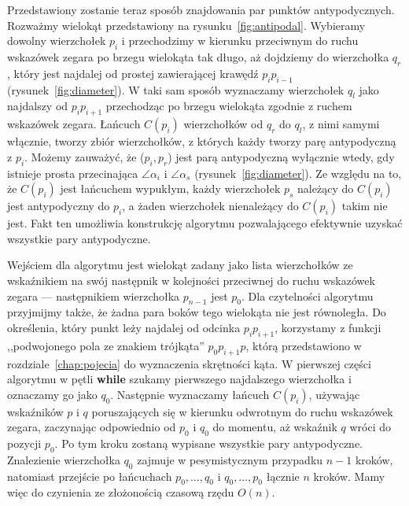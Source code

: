 Przedstawiony zostanie teraz sposób znajdowania par punktów
antypodycznych. Rozważmy wielokąt przedstawiony na
rysunku~\ref{fig:antipodal}. Wybieramy dowolny wierzchołek $p_i$ i
przechodzimy w kierunku przeciwnym do ruchu wskazówek zegara po brzegu
wielokąta tak długo, aż dojdziemy do wierzchołka $q_r$, który jest
najdalej od prostej zawierającej krawędź $p_{i}p_{i-1}$
(rysunek~\ref{fig:diameter}). W taki sam sposób wyznaczamy wierzchołek
$q_l$ jako najdalszy od $p_{i}p_{i+1}$ przechodząc po brzegu wielokąta
zgodnie z ruchem wskazówek zegara. Łańcuch $C(p_i)$ wierzchołków od
$q_r$ do $q_l$, z nimi samymi włącznie, tworzy zbiór wierzchołków, z
których każdy tworzy parę antypodyczną z $p_i$. Możemy zauważyć, że
($p_{i},p_{r}$) jest parą antypodyczną wyłącznie wtedy, gdy istnieje
prosta przecinająca $\angle \alpha_i$ i $\angle \alpha_s$
(rysunek~\ref{fig:diameter}). Ze względu na to, że $C(p_i)$ jest
łańcuchem wypukłym, każdy wierzchołek $p_s$ należący do $C(p_i)$ jest
antypodyczny do $p_i$, a żaden wierzchołek nienależący do $C(p_i)$
takim nie jest. Fakt ten umożliwia konstrukcję algorytmu pozwalającego
efektywnie uzyskać wszystkie pary antypodyczne.

Wejściem dla algorytmu jest wielokąt zadany jako lista wierzchołków ze
wskaźnikiem na swój następnik w kolejności przeciwnej do ruchu
wskazówek zegara --- następnikiem wierzchołka $p_{n-1}$ jest
$p_0$. Dla czytelności algorytmu przyjmijmy także, że żadna para boków
tego wielokąta nie jest równoległa. Do określenia, który punkt leży
najdalej od odcinka $p_{i}p_{i+1}$, korzystamy z funkcji ,,podwojonego
pola ze znakiem trójkąta'' $p_{0}p_{i+1}p$, którą przedstawiono w
rozdziale~\ref{chap:pojecia} do wyznaczenia skrętności kąta. W
pierwszej części algorytmu w pętli \textbf{while} szukamy pierwszego
najdalszego wierzchołka i oznaczamy go jako $q_0$. Następnie
wyznaczamy łańcuch $C(p_i)$, używając wskaźników $p$ i $q$
poruszających się w kierunku odwrotnym do ruchu wskazówek zegara,
zaczynając odpowiednio od $p_0$ i $q_0$ do momentu, aż wskaźnik $q$
wróci do pozycji $p_0$. Po tym kroku zostaną wypisane wszystkie pary
antypodyczne. Znalezienie wierzchołka $q_0$ zajmuje w pesymistycznym
przypadku $n-1$ kroków, natomiast przejście po łańcuchach $p_{0},
\ldots, q_{0}$ i $q_{0}, \ldots, p_{0}$ łącznie $n$ kroków. Mamy więc
do czynienia ze złożonością czasową rzędu $O(n)$.


